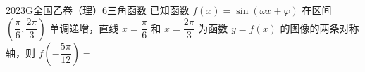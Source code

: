 
\begin{problem}{2023}{G}{全国乙卷（理）}{6}{三角函数}
已知函数 $ f(x) = \sin(\omega x + \varphi) $ 在区间 $ \left( \dfrac{\pi}{6}, \dfrac{2\pi}{3} \right) $ 单调递增，直线 $ x = \dfrac{\pi}{6} $ 和 $ x = \dfrac{2\pi}{3} $ 为函数 $ y = f(x) $ 的图像的两条对称轴，则 $ f\left( -\dfrac{5\pi}{12} \right) = $
\begin{choices}
\end{choices}
\end{problem}

\begin{answer}

\end{answer}

\begin{solutions}

\end{solutions}